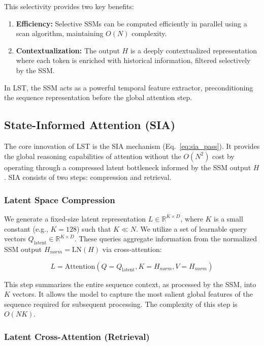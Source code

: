 \documentclass[10pt,twocolumn,letterpaper]{article}
\begin{document}
This selectivity provides two key benefits:
\begin{enumerate}
    \item \textbf{Efficiency:} Selective SSMs can be computed efficiently in parallel using a scan algorithm, maintaining \(O(N)\) complexity.
    \item \textbf{Contextualization:} The output \(H\) is a deeply contextualized representation where each token is enriched with historical information, filtered selectively by the SSM.
\end{enumerate}
In LST, the SSM acts as a powerful temporal feature extractor, preconditioning the sequence representation before the global attention step.

\subsection{State-Informed Attention (SIA)}

The core innovation of LST is the SIA mechanism (Eq.~\ref{eq:sia_pass}). It provides the global reasoning capabilities of attention without the \(O(N^{2})\) cost by operating through a compressed latent bottleneck informed by the SSM output \(H\). SIA consists of two steps: compression and retrieval.

\subsubsection{Latent Space Compression}

We generate a fixed-size latent representation \(L\in\mathbb{R}^{K\times D}\), where \(K\) is a small constant (e.g., \(K{=}128\)) such that \(K\ll N\). We utilize a set of learnable query vectors \(Q_{\text{latent}}\in\mathbb{R}^{K\times D}\). These queries aggregate information from the normalized SSM output \(H_{norm} = \text{LN}(H)\) via cross-attention:

\begin{equation}
L = \text{Attention}(Q=Q_{\text{latent}}, K=H_{norm}, V=H_{norm})
\end{equation}

This step summarizes the entire sequence context, as processed by the SSM, into \(K\) vectors. It allows the model to capture the most salient global features of the sequence required for subsequent processing. The complexity of this step is \(O(NK)\).

\subsubsection{Latent Cross-Attention (Retrieval)}
\end{document}
